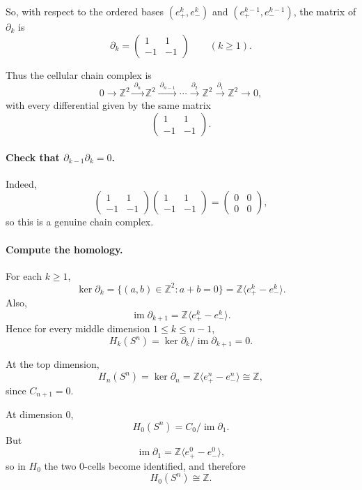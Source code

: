 \documentclass[12pt,a4paper]{article}
\theoremstyle{notespace}
\begin{document}
So, with respect to the ordered bases \((e^k_+,e^k_-)\) and \((e^{k-1}_+,e^{k-1}_-)\), the matrix of \(\partial_k\) is
\[
\partial_k=
\begin{pmatrix}
	1 & 1\\
	-1 & -1
\end{pmatrix}
\qquad (k\ge 1).
\]

Thus the cellular chain complex is
\[
0\longrightarrow \mathbb Z^2
\xrightarrow{\ \partial_n\ }
\mathbb Z^2
\xrightarrow{\ \partial_{n-1}\ }
\cdots
\xrightarrow{\ \partial_2\ }
\mathbb Z^2
\xrightarrow{\ \partial_1\ }
\mathbb Z^2
\longrightarrow 0,
\]
with every differential given by the same matrix
\[
\begin{pmatrix}
	1 & 1\\
	-1 & -1
\end{pmatrix}.
\]

\paragraph{Check that \(\partial_{k-1}\partial_k=0\).}
Indeed,
\[
\begin{pmatrix}
	1 & 1\\
	-1 & -1
\end{pmatrix}
\begin{pmatrix}
	1 & 1\\
	-1 & -1
\end{pmatrix}
=
\begin{pmatrix}
	0 & 0\\
	0 & 0
\end{pmatrix},
\]
so this is a genuine chain complex.

\paragraph{Compute the homology.}
For each \(k\ge 1\),
\[
\ker \partial_k
=
\{(a,b)\in \mathbb Z^2 : a+b=0\}
=
\mathbb Z\langle e^k_+ - e^k_- \rangle.
\]
Also,
\[
\operatorname{im}\partial_{k+1}
=
\mathbb Z\langle e^k_+ - e^k_- \rangle.
\]
Hence for every middle dimension \(1\le k\le n-1\),
\[
H_k(S^n)=\ker \partial_k/\operatorname{im}\partial_{k+1}=0.
\]

At the top dimension,
\[
H_n(S^n)=\ker \partial_n
=
\mathbb Z\langle e^n_+ - e^n_- \rangle
\cong \mathbb Z,
\]
since \(C_{n+1}=0\).

At dimension \(0\),
\[
H_0(S^n)=C_0/\operatorname{im}\partial_1.
\]
But
\[
\operatorname{im}\partial_1
=
\mathbb Z\langle e^0_+ - e^0_- \rangle,
\]
so in \(H_0\) the two \(0\)-cells become identified, and therefore
\[
H_0(S^n)\cong \mathbb Z.
\]
\end{document}
